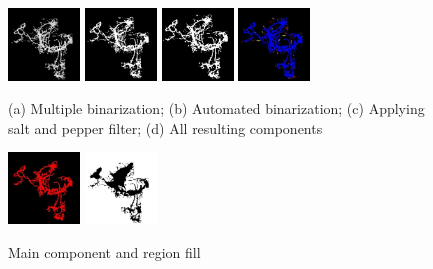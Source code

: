 \documentclass[conference]{IEEEtran}
\begin{document}
\begin{figure}
    \centering
    \includegraphics[width=0.17\textwidth]{fig/4.1binarizaremultipla.png}\hfill
    \includegraphics[width=0.17\textwidth]{fig/4.2binarizareautomata.png}\hfill
    \includegraphics[width=0.17\textwidth]{fig/5saltpepper.jpeg}\hfill
    \includegraphics[width=0.17\textwidth]{fig/7some_components.jpeg}
    \caption{(a) Multiple binarization; (b) Automated binarization; (c) 
    Applying salt and pepper filter; (d) All resulting components}
    \label{fig:processing2}
\end{figure}

\begin{figure}
    \centering
    \includegraphics[width=0.17\textwidth]{fig/8main_component.jpeg}\hfill
    \includegraphics[width=0.17\textwidth]{fig/29.png}
    \caption{Main component and region fill}
    \label{fig:result}
\end{figure}
\end{document}
